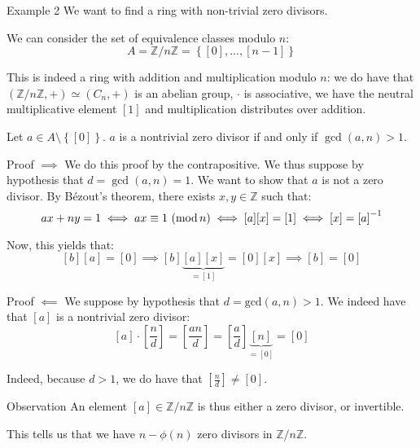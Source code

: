 \documentclass[a4paper]{article}
\begin{document}
\begin{parag}{Example 2}
    We want to find a ring with non-trivial zero divisors. 

    We can consider the set of equivalence classes modulo $n$: 
    \[A = \mathbb{Z}/n\mathbb{Z} = \left\{\left[0\right], \ldots, \left[n-1\right]\right\}\]

    This is indeed a ring with addition and multiplication modulo $n$: we do have that $\left(\mathbb{Z}/n\mathbb{Z}, +\right) \simeq \left(C_n, +\right)$ is an abelian group, $\cdot $ is associative, we have the neutral multiplicative element $\left[1\right]$ and multiplication distributes over addition.

    Let $a \in A \setminus \left\{\left[0\right]\right\}$. $a$ is a nontrivial zero divisor if and only if $\gcd\left(a, n\right) > 1$.

    \begin{subparag}{Proof $\implies$}
        We do this proof by the contrapositive. We thus suppose by hypothesis that $d = \gcd\left(a, n\right) = 1$. We want to show that $a$ is not a zero divisor. By Bézout's theorem, there exists $x, y \in \mathbb{Z}$ such that: 
        \[ax + ny = 1 \iff \congruent{ax}{1}{n} \iff \left[a\right]\left[x\right] = \left[1\right] \iff \left[x\right] = \left[a\right]^{-1}\]
        
        Now, this yields that: 
        \[\left[b\right]\left[a\right] = \left[0\right] \implies \left[b\right]\underbrace{\left[a\right]\left[x\right]}_{= \left[1\right]} = \left[0\right] \left[x\right] \implies \left[b\right] = \left[0\right]\]
    \end{subparag}

    \begin{subparag}{Proof $\impliedby$}
         We suppose by hypothesis that $d = \text{gcd}\left(a, n\right) > 1$. We indeed have that $\left[a\right]$ is a nontrivial zero divisor: 
    \[\left[a\right] \cdot \left[\frac{n}{d}\right] = \left[\frac{an}{d}\right] = \left[\frac{a}{d}\right] \underbrace{\left[n\right]}_{= \left[0\right]} = \left[0\right]\]
    
        Indeed, because $d > 1$, we do have that $\left[\frac{n}{d}\right] \neq \left[0\right]$.
    \end{subparag}
    
    \begin{subparag}{Observation}
        An element $\left[a\right] \in \mathbb{Z}/n\mathbb{Z}$ is thus either a zero divisor, or invertible.

        This tells us that we have $n - \phi\left(n\right)$ zero divisors in $\mathbb{Z}/n\mathbb{Z}$.
    \end{subparag}
\end{parag}
\end{document}
